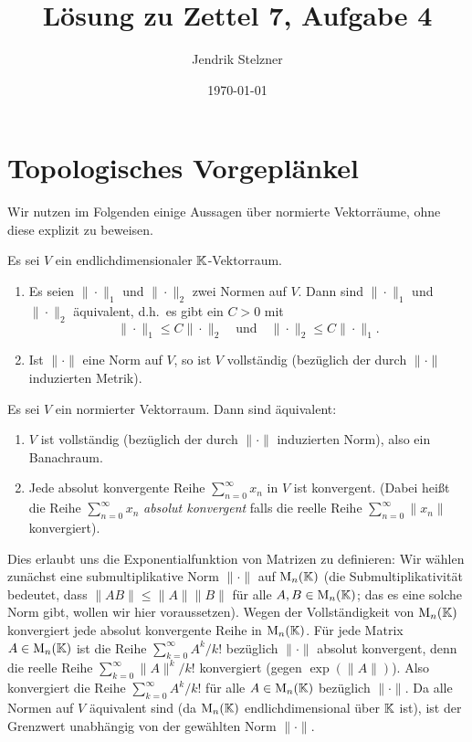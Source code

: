 \documentclass[a4paper, 10pt, numbers=noenddot]{scrartcl}
\title{Lösung zu Zettel 7, Aufgabe 4}
\author{Jendrik Stelzner}
\date{\today}
\begin{document}
\maketitle





\section{Topologisches Vorgeplänkel}
Wir nutzen im Folgenden einige Aussagen über normierte Vektorräume, ohne diese explizit zu beweisen.

\begin{lemma}
  Es sei $V$ ein endlichdimensionaler $\mathbb{K}$-Vektorraum.
  \begin{enumerate}[leftmargin=*]
    \item
      Es seien $\|\cdot\|_1$ und $\|\cdot\|_2$ zwei Normen auf $V$.
      Dann sind $\|\cdot\|_1$ und $\|\cdot\|_2$ äquivalent, d.h.\ es gibt ein $C > 0$ mit
      \[
        \|\cdot\|_1 \leq C \|\cdot\|_2
        \quad\text{und}\quad
        \|\cdot\|_2 \leq C \|\cdot\|_1.
      \]
    \item
      Ist $\|\cdot\|$ eine Norm auf $V$, so ist $V$ vollständig (bezüglich der durch $\|\cdot\|$ induzierten Metrik).
  \end{enumerate}
\end{lemma}

\begin{lemma}
  Es sei $V$ ein normierter Vektorraum.
  Dann sind äquivalent:
  \begin{enumerate}
    \item
      $V$ ist vollständig (bezüglich der durch $\|\cdot\|$ induzierten Norm), also ein Banachraum.
    \item
      Jede absolut konvergente Reihe $\sum_{n=0}^\infty x_n$ in $V$ ist konvergent. (Dabei heißt die Reihe $\sum_{n=0}^\infty x_n$ \emph{absolut konvergent} falls die reelle Reihe $\sum_{n=0}^\infty \|x_n\|$ konvergiert).
  \end{enumerate}
\end{lemma}


Dies erlaubt uns die Exponentialfunktion von Matrizen zu definieren:
Wir wählen zunächst eine submultiplikative Norm $\|\cdot\|$ auf $\operatorname{M}_n(\mathbb{K})$ (die Submultiplikativität bedeutet, dass $\|A B\| \leq \|A\| \|B\|$ für alle $A, B \in \operatorname{M}_n(\mathbb{K})$; das es eine solche Norm gibt, wollen wir hier voraussetzen).
Wegen der Vollständigkeit von $\operatorname{M}_n(\mathbb{K})$ konvergiert jede absolut konvergente Reihe in $\operatorname{M}_n(\mathbb{K})$.
Für jede Matrix $A \in \operatorname{M}_n(\mathbb{K})$ ist die Reihe $\sum_{k=0}^\infty A^k/k!$ bezüglich $\|\cdot\|$ absolut konvergent, denn die reelle Reihe $\sum_{k=0}^\infty \|A\|^k/k!$ konvergiert (gegen $\exp(\|A\|)$).
Also konvergiert die Reihe $\sum_{k=0}^\infty A^k/k!$ für alle $A \in \operatorname{M}_n(\mathbb{K})$ bezüglich $\|\cdot\|$.
Da alle Normen auf $V$ äquivalent sind (da $\operatorname{M}_n(\mathbb{K})$ endlichdimensional über $\mathbb{K}$ ist), ist der Grenzwert unabhängig von der gewählten Norm $\|\cdot\|$.
\end{document}
